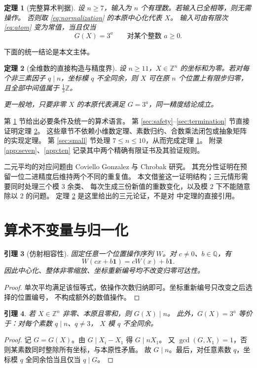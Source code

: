 \documentclass[UTF8,fontset=fandol,zihao=-4,a4paper]{ctexart}
\numberwithin{equation}{section}
\newtheorem{theorem}{定理}[section]
\newtheorem{lemma}[theorem]{引理}
\theoremstyle{definition}
\newcommand{\Z}{\mathbb Z}
\newcommand{\Q}{\mathbb Q}
\newcommand{\one}{\boldsymbol 1}
\begin{document}
\begin{theorem}[完整算术判据]\label{thm:main}
设 $n\ge7$，输入为 $n$ 个有理数。若输入已全相等，则无需操作。
否则取 \eqref{eq:normalization} 的本原中心化代表 $X$。
输入可由有限次 \eqref{eq:atom} 变为常值，当且仅当
\[
 G(X)=3^a\qquad\text{对某个整数 }a\ge0.
\]
\end{theorem}

下面的统一结论是本文主体。
\begin{theorem}[全维数的直接构造与精度界]\label{thm:uniform}
设 $n\ge11$，$X\in\Z^n$ 的坐标和为零。若对每个非三素因子
$q\mid n$，坐标模 $q$ 不全同余，则 $X$ 可在原 $n$ 个位置上有限步归零，
且全部中间值属于 $\frac13\Z$。

更一般地，只要非零 $X$ 的本原代表满足 $G=3^a$，同一精度结论成立。
\end{theorem}

第 \ref{sec:arithmetic} 节给出必要条件及统一的算术语言。
第 \ref{sec:safety}--\ref{sec:termination} 节直接证明定理 \ref{thm:uniform}。
这些章节不依赖小维数定理、素数归约、合数乘法闭包或抽象矩阵的实现定理。
第 \ref{sec:small} 节处理 $7\le n\le10$，从而完成定理 \ref{thm:main}。
附录 \ref{app:seven}、\ref{app:ten} 记录其中两个精确有限证书及其验证规则。

二元平均的对应问题由 Coviello Gonzalez 与 Chrobak \cite{mixability} 研究。
其充分性证明在预留一位二进精度后维持两个不同的重复值。
本文借鉴这一证明结构；三元情形需要同时处理三个模 $3$ 余类、
每次生成三份新值的重数变化，以及模 $2$ 下不能随意除以 $2$ 的问题。
定理 \ref{thm:uniform} 是这里给出的三元论证，不是对 \cite{mixability} 中定理的直接引用。

\section{算术不变量与归一化}\label{sec:arithmetic}

\begin{lemma}[仿射相容性]\label{lem:affine-equivariance}
固定任意一个位置操作序列 $W$。对 $c\ne0$、$b\in\Q$，有
\[
 W(cx+b\one)=cW(x)+b\one.
\]
因此中心化、整体非零缩放、坐标重新编号均不改变归零可达性。
\end{lemma}
\begin{proof}
单次平均满足该恒等式，依操作次数归纳即可。坐标重新编号只改变之后选择的位置编号，
不构成额外的数值操作。
\end{proof}

\begin{lemma}\label{lem:G-divides-n}
若 $X\in\Z^n$ 非零、本原且零和，则 $G(X)\mid n$。
此外，$G(X)=3^a$ 等价于：对每个素数 $q\mid n$、$q\ne3$，
$X$ 模 $q$ 不全同余。
\end{lemma}
\begin{proof}
记 $G=G(X)$。由 $G\mid X_i-X_1$ 得 $G\mid nX_1$。
又 $\gcd(G,X_1)=1$，否则某素数同时整除所有坐标，与本原性矛盾。
故 $G\mid n$。最后，对任意素数 $q$，坐标模 $q$ 全同余恰当且仅当 $q\mid G$。
\end{proof}
\end{document}
